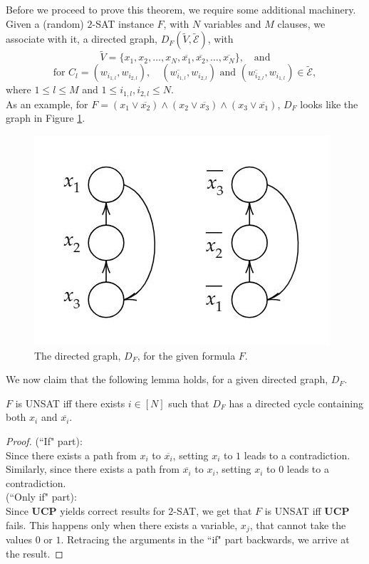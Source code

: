\documentclass[letterpaper,english,11pt]{article}
\begin{document}
Before we proceed to prove this theorem, we require some additional machinery. Given a (random) $2$-SAT instance $F$, with $N$ variables and $M$ clauses, we associate with it, a directed graph, $D_{F}(\tilde{V},\tilde{\mathscr{E}})$, with
\begin{equation*}
    \tilde{V}=\{x_1,x_2,\ldots,x_N,\overline{x_1},\overline{x_2},\ldots,\overline{x_N}\},\quad\text{and}
\end{equation*}
\begin{equation*}
    \text{for }C_l=(w_{i_{1,l}},w_{i_{2,l}}),\quad (\overline{w_{i_{1,l}}},w_{i_{2,l}})\text{ and }(\overline{w_{i_{2,l}}},w_{i_{1,l}})\in \tilde{\mathscr{E}},
\end{equation*}
where $1\leq l\leq M$ and $1\leq i_{1,l},i_{2,l}\leq N$.\\

As an example, for $F=(x_1\vee \overline{x_2})\wedge(x_2\vee \overline{x_3})\wedge(x_3\vee \overline{x_1})$, $D_F$ looks like the graph in Figure \ref{fig:graph}. 
\begin{figure}[h]
\centering
\includegraphics[scale=0.6]{./Figures/Directed_graph.JPG}
\caption{The directed graph, $D_F$, for the given formula $F$.}
\label{fig:graph}
\end{figure}
We now claim that the following lemma holds, for a given directed graph, $D_F$.
\begin{lem}
$F$ is UNSAT iff there exists $i\in [N]$ such that $D_F$ has a directed cycle containing both $x_i$ and $\overline{x_i}$.
\end{lem}
\begin{proof}
(``If" part):\\
Since there exists a path from $x_i$ to $\overline{x_i}$, setting $x_i$ to $1$ leads to a contradiction.\\
Similarly, since there exists a path from $\overline{x_i}$ to ${x_i}$, setting $x_i$ to $0$ leads to a contradiction.\\

(``Only if" part):\\
Since \textbf{UCP} yields correct results for $2$-SAT, we get that $F$ is UNSAT iff \textbf{UCP} fails. This happens only when there exists a variable, $x_j$, that cannot take the values $0$ or $1$. Retracing the arguments in the ``if" part backwards, we arrive at the result. 
\end{proof}
\end{document}
